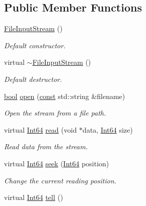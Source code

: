 \subsection*{Public Member Functions}
\begin{DoxyCompactItemize}
\item 
\hyperlink{classsf_1_1_file_input_stream_a9a321e273f41ff7f187899061fcae9be}{File\-Input\-Stream} ()
\begin{DoxyCompactList}\small\item\em Default constructor. \end{DoxyCompactList}\item 
virtual \hyperlink{classsf_1_1_file_input_stream_ad49ae2025ff2183f80067943a7d0276d}{$\sim$\-File\-Input\-Stream} ()
\begin{DoxyCompactList}\small\item\em Default destructor. \end{DoxyCompactList}\item 
\hyperlink{term__entry_8h_a002004ba5d663f149f6c38064926abac}{bool} \hyperlink{classsf_1_1_file_input_stream_a87a95dc3a71746097a99c86ee58bb353}{open} (\hyperlink{term__entry_8h_a57bd63ce7f9a353488880e3de6692d5a}{const} std\-::string \&filename)
\begin{DoxyCompactList}\small\item\em Open the stream from a file path. \end{DoxyCompactList}\item 
virtual \hyperlink{namespacesf_a2840579fed3494d9f330baf7a5a19903}{Int64} \hyperlink{classsf_1_1_file_input_stream_ad1e94c4152429f485db224c44ee1eb50}{read} (void $\ast$data, \hyperlink{namespacesf_a2840579fed3494d9f330baf7a5a19903}{Int64} size)
\begin{DoxyCompactList}\small\item\em Read data from the stream. \end{DoxyCompactList}\item 
virtual \hyperlink{namespacesf_a2840579fed3494d9f330baf7a5a19903}{Int64} \hyperlink{classsf_1_1_file_input_stream_abdaf5700d4e1de07568e7829106b4eb9}{seek} (\hyperlink{namespacesf_a2840579fed3494d9f330baf7a5a19903}{Int64} position)
\begin{DoxyCompactList}\small\item\em Change the current reading position. \end{DoxyCompactList}\item 
virtual \hyperlink{namespacesf_a2840579fed3494d9f330baf7a5a19903}{Int64} \hyperlink{classsf_1_1_file_input_stream_a768c5fdb3be79e2d71d1bce911f8741c}{tell} ()

\end{DoxyCompactItemize}

